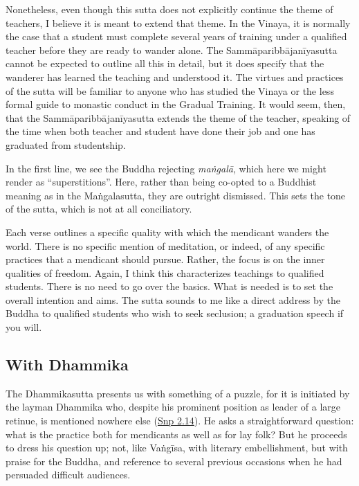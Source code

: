 \documentclass[12pt,openany]{book}%
\begin{document}
Nonetheless, even though this sutta does not explicitly continue the theme of teachers, I believe it is meant to extend that theme. In the Vinaya, it is normally the case that a student must complete several years of training under a qualified teacher before they are ready to wander alone. The \textsanskrit{Sammāparibbājanīyasutta} cannot be expected to outline all this in detail, but it does specify that the wanderer has learned the teaching and understood it. The virtues and practices of the sutta will be familiar to anyone who has studied the Vinaya or the less formal guide to monastic conduct in the Gradual Training. It would seem, then, that the \textsanskrit{Sammāparibbājanīyasutta} extends the theme of the teacher, speaking of the time when both teacher and student have done their job and one has graduated from studentship.

In the first line, we see the Buddha rejecting \textit{\textsanskrit{maṅgalā}}, which here we might render as “superstitions”. Here, rather than being co-opted to a Buddhist meaning as in the \textsanskrit{Maṅgalasutta}, they are outright dismissed. This sets the tone of the sutta, which is not at all conciliatory.

Each verse outlines a specific quality with which the mendicant wanders the world. There is no specific mention of meditation, or indeed, of any specific practices that a mendicant should pursue. Rather, the focus is on the inner qualities of freedom. Again, I think this characterizes teachings to qualified students. There is no need to go over the basics. What is needed is to set the overall intention and aims. The sutta sounds to me like a direct address by the Buddha to qualified students who wish to seek seclusion; a graduation speech if you will.

\subsection*{With Dhammika}

The Dhammikasutta presents us with something of a puzzle, for it is initiated by the layman Dhammika who, despite his prominent position as leader of a large retinue, is mentioned nowhere else (\href{https://suttacentral.net/snp2.14/en/sujato}{Snp 2.14}). He asks a straightforward question: what is the practice both for mendicants as well as for lay folk? But he proceeds to dress his question up; not, like \textsanskrit{Vaṅgīsa}, with literary embellishment, but with praise for the Buddha, and reference to several previous occasions when he had persuaded difficult audiences.
\end{document}

